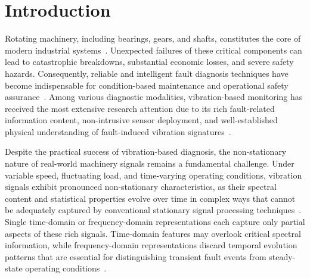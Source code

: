 \documentclass[pdflatex,sn-mathphys-num]{sn-jnl}
\theoremstyle{thmstyleone}%
\theoremstyle{thmstyletwo}%
\theoremstyle{thmstylethree}%
\begin{document}

\maketitle

\section{Introduction}

Rotating machinery, including bearings, gears, and shafts, constitutes the core of modern industrial systems~\cite{10313245,GAO2026114419,MIAO2022108116}. Unexpected failures of these critical components can lead to catastrophic breakdowns, substantial economic losses, and severe safety hazards. Consequently, reliable and intelligent fault diagnosis techniques have become indispensable for condition-based maintenance and operational safety assurance~\cite{6899683}. Among various diagnostic modalities, vibration-based monitoring has received the most extensive research attention due to its rich fault-related information content, non-intrusive sensor deployment, and well-established physical understanding of fault-induced vibration signatures~\cite{YI2025116881,9440949}.

Despite the practical success of vibration-based diagnosis, the non-stationary nature of real-world machinery signals remains a fundamental challenge. Under variable speed, fluctuating load, and time-varying operating conditions, vibration signals exhibit pronounced non-stationary characteristics, as their spectral content and statistical properties evolve over time in complex ways that cannot be adequately captured by conventional stationary signal processing techniques~\cite{8853278,9242332}. Single time-domain or frequency-domain representations each capture only partial aspects of these rich signals. Time-domain features may overlook critical spectral information, while frequency-domain representations discard temporal evolution patterns that are essential for distinguishing transient fault events from steady-state operating conditions~\cite{HONG20142164,10319398}.
\end{document}

